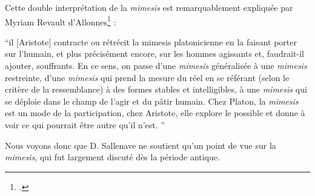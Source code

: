 \documentclass[a4paper,10pt]{article}
\begin{document}
				Cette double interprétation de la \textit{mimesis} est remarquablement expliquée par Myriam Revault d'Allonnes\footcite{Revault1992} :
				\begin{center}
					\footnotesize
					\begin{minipage}{0.7\textwidth}
						``il [Aristote] contracte ou rétrécit la mimesis platonicienne en la faisant porter sur l'humain, et plus précisément encore, sur les hommes agissants et, faudrait-il ajouter, souffrants. En ce sens, on passe d'une \textit{mimesis} généralisée à une \textit{mimesis} restreinte, d'une \textit{mimesis} qui prend la mesure du réel en se référant (selon le critère de la ressemblance) à des formes stables et intelligibles, à une \textit{mimesis} qui se déploie dans le champ de l'agir et du pâtir humain. Chez Platon, la \textit{mimesis} est un mode de la participation, chez Aristote,
						elle explore le possible et donne à voir ce qui pourrait être autre qu'il n'est. ''
					\end{minipage}
				\end{center}
				Nous voyons donc que D. Sallenave ne soutient qu'un point de vue sur la \textit{mimesis}, qui fut largement discuté dès la période antique.
				
\end{document}
